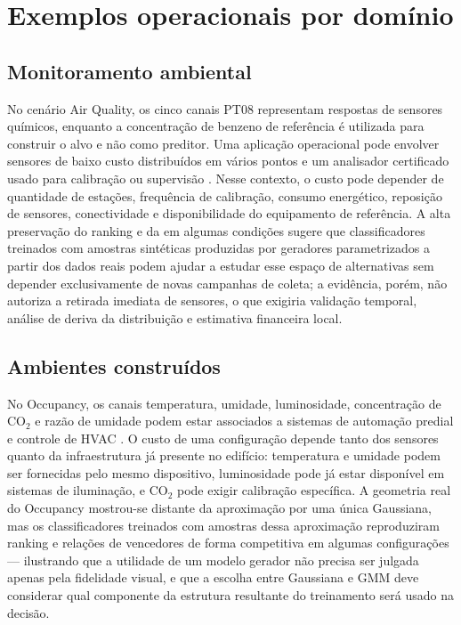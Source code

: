 \section{Exemplos operacionais por domínio}

\subsection{Monitoramento ambiental}

No cenário Air Quality, os cinco canais PT08 representam respostas de sensores químicos, enquanto a concentração de benzeno de referência é utilizada para construir o alvo e não como preditor. Uma aplicação operacional pode envolver sensores de baixo custo distribuídos em vários pontos e um analisador certificado usado para calibração ou supervisão \cite{devito2008,UciAirQuality2008}. Nesse contexto, o custo pode depender de quantidade de estações, frequência de calibração, consumo energético, reposição de sensores, conectividade e disponibilidade do equipamento de referência. A alta preservação do ranking e da \WinnersAgreement{} em algumas condições sugere que classificadores treinados com amostras sintéticas produzidas por geradores parametrizados a partir dos dados reais podem ajudar a estudar esse espaço de alternativas sem depender exclusivamente de novas campanhas de coleta; a evidência, porém, não autoriza a retirada imediata de sensores, o que exigiria validação temporal, análise de deriva da distribuição e estimativa financeira local.

\subsection{Ambientes construídos}

No Occupancy, os canais temperatura, umidade, luminosidade, concentração de CO$_2$ e razão de umidade podem estar associados a sistemas de automação predial e controle de HVAC \cite{candanedo2016,Weber2020}. O custo de uma configuração depende tanto dos sensores quanto da infraestrutura já presente no edifício: temperatura e umidade podem ser fornecidas pelo mesmo dispositivo, luminosidade pode já estar disponível em sistemas de iluminação, e CO$_2$ pode exigir calibração específica. A geometria real do Occupancy mostrou-se distante da aproximação por uma única Gaussiana, mas os classificadores treinados com amostras dessa aproximação reproduziram ranking e relações de vencedores de forma competitiva em algumas configurações --- ilustrando que a utilidade de um modelo gerador não precisa ser julgada apenas pela fidelidade visual, e que a escolha entre Gaussiana e GMM deve considerar qual componente da estrutura resultante do treinamento será usado na decisão.

